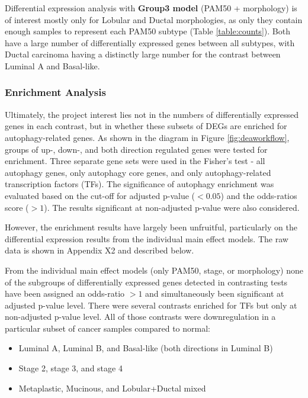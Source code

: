         \newpage
        Differential expression analysis with \textbf{Group3 model} (PAM50 + morphology) is of interest mostly only for Lobular and Ductal morphologies, as only they contain enough samples to represent each PAM50 subtype (Table \ref{table:counts}). Both have a large number of differentially expressed genes between all subtypes, with Ductal carcinoma having a distinctly large number for the contrast between Luminal A and Basal-like.  \\

        \subsubsection{Enrichment Analysis}
        
        Ultimately, the project interest lies not in the numbers of differentially expressed genes in each contrast, but in whether these subsets of DEGs are enriched for autophagy-related genes. As shown in the diagram in Figure \ref{fig:deaworkflow}, groups of up-, down-, and both direction regulated genes were tested for enrichment. Three separate gene sets were used in the Fisher’s test - all autophagy genes, only autophagy core genes, and only autophagy-related transcription factors (TFs). The significance of autophagy enrichment was evaluated based on the cut-off for adjusted p-value ($<0.05$) and the odds-ratios score ($>1$). The results significant at non-adjusted p-value were also considered.

        However, the enrichment results have largely been unfruitful, particularly on the differential expression results from the individual main effect models. The raw data is shown in Appendix X2 and described below.  
        
        From the individual main effect models (only PAM50, stage, or morphology) none of the subgroups of differentially expressed genes detected in contrasting tests have been assigned an odds-ratio $>1$ and simultaneously been significant at adjusted p-value level. There were several contrasts enriched for TFs but only at non-adjusted p-value level. All of those contrasts were downregulation in a particular subset of cancer samples compared to normal:
        
        \begin{itemize}
            \item Luminal A, Luminal B, and Basal-like  (both directions in Luminal B)
            \item Stage 2, stage 3, and stage 4 
            \item Metaplastic, Mucinous, and Lobular+Ductal mixed \\
        \end{itemize}
        
